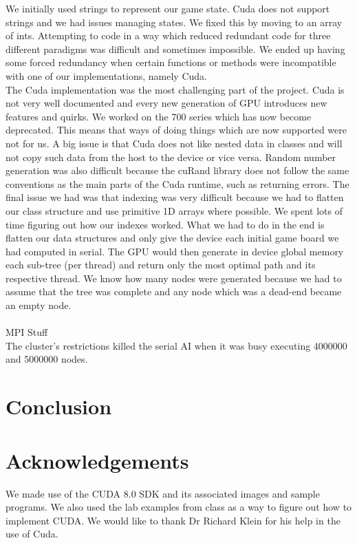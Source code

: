 \documentclass[11pt]{article}
\begin{document}
\begin{page}
We initially used strings to represent our game state. Cuda does not support strings and we had issues managing states. We fixed this by moving to an array of ints.
Attempting to code in a way which reduced redundant code for three different paradigms was difficult and sometimes impossible. We ended up having some forced redundancy when certain functions or methods were incompatible with one of our implementations, namely Cuda.\\

The Cuda implementation was the most challenging part of the project. Cuda is not very well documented and every new generation of GPU introduces new features and quirks. We worked on the 700 series which has now become deprecated. This means that ways of doing things which are now supported were not for us. A big issue is that Cuda does not like nested data in classes and will not copy such data from the host to the device or vice versa. Random number generation was also difficult because the cuRand library does not follow the same conventions as the main parts of the Cuda runtime, such as returning errors. The final issue we had was that indexing was very difficult because we had to flatten our class structure and use primitive 1D arrays where possible. We spent lots of time figuring out how our indexes worked. What we had to do in the end is flatten our data structures and only give the device each initial game board we had computed in serial. The GPU would then generate in device global memory each sub-tree (per thread) and return only the most optimal path and its respective thread. We know how many nodes were generated because we had to assume that the tree was complete and any node which was a dead-end became an empty node.\\

\\
MPI Stuff\\
The cluster’s restrictions killed the serial AI when it was busy executing 4000000 and 5000000 nodes.


\section{Conclusion}

\section*{Acknowledgements}
We made use of the CUDA 8.0 SDK and its associated images and sample programs. We also used the lab examples from class as a way to figure out how to implement CUDA. We would like to thank Dr Richard Klein for his help in the use of Cuda.


{}
\end{page}
\end{document}
